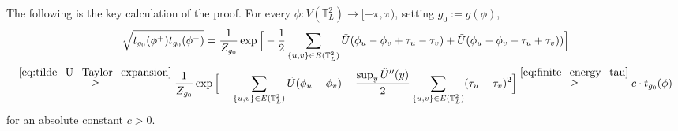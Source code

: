 \documentclass[12pt,reqno]{article}
\def\T{\mathbb{T}}
\begin{document}
The following is the key calculation of the proof. For every
$\phi:V(\T_L^2)\to[-\pi,\pi)$, setting $g_0:=g(\phi)$,
\begin{multline}\label{eq:geometric_average_densities}
\sqrt{t_{g_0}(\phi^+)t_{g_0}(\phi^-)} = \frac{1}{Z_{g_0}}\exp
\Big[-\frac{1}{2}\sum_{\{u,v\}\in E(\T_L^2)}\tilde{U}(\phi_u - \phi_v +
\tau_u - \tau_v) + \tilde{U}(\phi_u - \phi_v - \tau_u +
\tau_v))\Big]\\
\stackrel{\eqref{eq:tilde_U_Taylor_expansion}}{\ge}\frac{1}{Z_{g_0}}\exp
\Big[-\sum_{\{u,v\}\in E(\T_L^2)}\tilde{U}(\phi_u - \phi_v) -
\frac{\sup_y \tilde{U}''(y)}{2} \sum_{\{u,v\}\in E(\T_L^2)} (\tau_u -
\tau_v)^2\Big] \stackrel{\eqref{eq:finite_energy_tau}}{\ge} c\cdot
t_{g_0}(\phi)
\end{multline}
for an absolute constant $c>0$.
\end{document}
